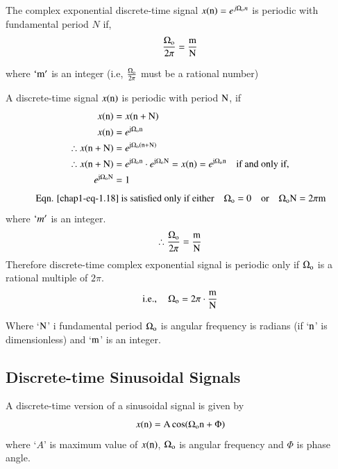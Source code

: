 The complex exponential discrete-time signal $x(\textrm{n})= e^{j\Omega_{o}n}$  is periodic with fundamental period $N$ if,
\begin{equation}
\dfrac{\Omega_{\textrm{o}}}{2 \pi} = \dfrac{\textrm{m}}{\textrm{N}}\label{chap1-eq-1.16}
\end{equation}

where $`\textrm{m}'$  is an integer (i.e, $\frac{\Omega_{\textrm{o}}}{2\pi}$ must be a rational number)

A discrete-time signal $x(\textrm{n})$ is periodic with period $\textrm{N}$, if
\begin{align}
x(\textrm{n}) &= x(\textrm{n} + \textrm{N})\notag\\
x(\textrm{n}) &= e^{\textrm{j} \Omega_{\textrm{o}}\textrm{n}}\notag\\
\therefore x(\textrm{n} + \textrm{N})&= e^{\textrm{j} \Omega_{\textrm{o}}(\textrm{n} + \textrm{N})}\label{chap1-eq-1.17}\\ 
\therefore x(\textrm{n} + \textrm{N})&= e^{\textrm{j} \Omega_{\textrm{o}}\textrm{n}} \cdot e^{\textrm{j} \Omega_{\textrm{o}} \textrm{N}}=x(\textrm{n})= e^{\textrm{j} \Omega_{\textrm{o}}\textrm{n}} \quad \text{if and only if},\notag\\
e^{\textrm{j} \Omega_{\textrm{o}} \textrm{N}} &= 1\label{chap1-eq-1.18}
\end{align}
\begin{equation}
\text{Eqn. \ref{chap1-eq-1.18} is satisfied  only if either} \quad \Omega_{\textrm{o}} = 0\quad \text{or} \quad
\Omega_{\textrm{o}}\textrm{N}= 2\pi \textrm{m}\label{chap1-eq-1.19}
\end{equation}
where $`m'$ is an integer.
\begin{equation}
\therefore \dfrac{\Omega_{\textrm{o}}}{2 \pi}  = \dfrac{\textrm{m}}{\textrm{N}}\label{chap1-eq-1.20}
\end{equation}
Therefore discrete-time complex exponential signal is periodic only if $\Omega_{\textrm{o}}$ is a rational multiple of $2\pi$.
\begin{equation}
\text{i.e.},  \quad \Omega_{\textrm{o}} = 2\pi \cdot \dfrac{\textrm{m}}{\textrm{N}}\label{chap1-eq-1.21}
\end{equation}

Where `$\textrm{N}$' i fundamental period $\Omega_{\textrm{o}}$ is angular frequency is radians (if `$\textrm{n}$' is  dimensionless) and `$\textrm{m}$' is an integer.

\subsection{Discrete-time Sinusoidal Signals}\label{chap1-subsec-1.4.2}

A discrete-time version of a sinusoidal signal is given by
\begin{equation}
x(\textrm{n}) = \textrm{A} \cos (\Omega_{\textrm{o}}\textrm{n} + \Phi)\label{chap1-eq-1.22}
\end{equation}
where `$A$' is maximum value of $x(\textrm{n})$, $\Omega_{\textrm{o}}$ is angular frequency and $\Phi$ is phase angle.

